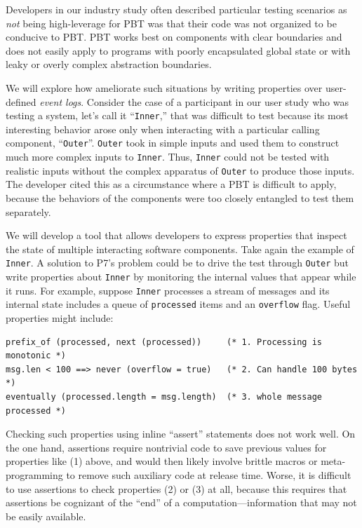 
%
Developers in our industry study often described particular
testing scenarios as {\em not} being high-leverage for PBT was that
their code was not organized to be conducive to
PBT.  PBT works best on components with clear boundaries and does not
easily apply to programs with
poorly encapsulated global state or with leaky or overly complex abstraction
boundaries.

We will explore
how ameliorate such situations by writing properties over user-defined
{\em event logs}. Consider
the case of a participant in our user
study who was testing
a system, let's call it ``\lstinline{Inner},'' that  was difficult to
test because
its most interesting behavior arose only when interacting with a particular calling
component, ``\lstinline{Outer}''.
\lstinline{Outer} took in simple inputs and used them to construct
much more complex inputs to \lstinline{Inner}. Thus, \lstinline{Inner}
could not be tested with
realistic inputs without the complex apparatus of \lstinline{Outer} to
produce those inputs.  The developer cited this as a circumstance where a
PBT is difficult to apply, because the behaviors of the components were too
closely entangled to test them separately.

We will develop a tool that allows developers to express properties that inspect
the state of multiple interacting software components. Take again the example of
\lstinline{Inner}. A solution to P7's problem could be to drive the
test through \lstinline{Outer} but write properties about
\lstinline{Inner} by monitoring the internal values that appear while it
runs. For example, suppose
\lstinline{Inner} processes a stream of messages and its internal state
includes a queue of \lstinline{processed} items and an
\lstinline{overflow} flag. Useful properties might include:

\begin{lstlisting}
prefix_of (processed, next (processed))     (* 1. Processing is monotonic *)
msg.len < 100 ==> never (overflow = true)   (* 2. Can handle 100 bytes    *)
eventually (processed.length = msg.length)  (* 3. whole message processed *)
\end{lstlisting}

Checking such properties using inline ``assert'' statements
does not work well. On the one hand, assertions
require nontrivial code to save previous values for properties like (1)
above, and would then likely involve brittle macros or meta-programming to remove such
auxiliary code at release time. Worse, it is difficult to use
assertions to check properties (2) or (3) at all, because this
requires that assertions be cognizant of the ``end'' of a
computation---information that may not be easily available.

